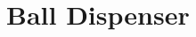 \documentclass[Rapport/Rapport_main.tex]{subfiles}
\begin{document}
\section{Ball Dispenser}
\end{document}
